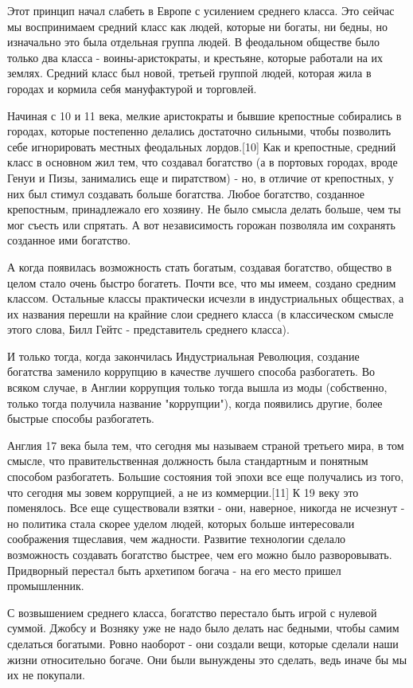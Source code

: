 \documentclass[ebook,12pt,oneside,openany]{memoir}
\begin{document}
Этот принцип начал слабеть в Европе с усилением среднего класса. Это
сейчас мы воспринимаем средний класс как людей, которые ни богаты, ни
бедны, но изначально это была отдельная группа людей. В феодальном
обществе было только два класса - воины-аристократы, и крестьяне,
которые работали на их землях. Средний класс был новой, третьей
группой людей, которая жила в городах и кормила себя мануфактурой и
торговлей.

Начиная с 10 и 11 века, мелкие аристократы и бывшие крепостные
собирались в городах, которые постепенно делались достаточно сильными,
чтобы позволить себе игнорировать местных феодальных лордов.[10] Как и
крепостные, средний класс в основном жил тем, что создавал богатство
(а в портовых городах, вроде Генуи и Пизы, занимались еще и
пиратством) - но, в отличие от крепостных, у них был стимул создавать
больше богатства. Любое богатство, созданное крепостным, принадлежало
его хозяину. Не было смысла делать больше, чем ты мог съесть или
спрятать. А вот независимость горожан позволяла им сохранять созданное
ими богатство.

А когда появилась возможность стать богатым, создавая богатство,
общество в целом стало очень быстро богатеть. Почти все, что мы имеем,
создано средним классом. Остальные классы практически исчезли в
индустриальных обществах, а их названия перешли на крайние слои
среднего класса (в классическом смысле этого слова, Билл Гейтс -
представитель среднего класса).

И только тогда, когда закончилась Индустриальная Революция, создание
богатства заменило коррупцию в качестве лучшего способа разбогатеть.
Во всяком случае, в Англии коррупция только тогда вышла из моды
(собственно, только тогда получила название "коррупции"), когда
появились другие, более быстрые способы разбогатеть.

Англия 17 века была тем, что сегодня мы называем страной третьего
мира, в том смысле, что правительственная должность была стандартным и
понятным способом разбогатеть. Большие состояния той эпохи все еще
получались из того, что сегодня мы зовем коррупцией, а не из
коммерции.[11] К 19 веку это поменялось. Все еще существовали взятки -
они, наверное, никогда не исчезнут - но политика стала скорее уделом
людей, которых больше интересовали соображения тщеславия, чем
жадности. Развитие технологии сделало возможность создавать богатство
быстрее, чем его можно было разворовывать. Придворный перестал быть
архетипом богача - на его место пришел промышленник.

С возвышением среднего класса, богатство перестало быть игрой с
нулевой суммой. Джобсу и Возняку уже не надо было делать нас бедными,
чтобы самим сделаться богатыми. Ровно наоборот - они создали вещи,
которые сделали наши жизни относительно богаче. Они были вынуждены это
сделать, ведь иначе бы мы их не покупали.
\end{document}
